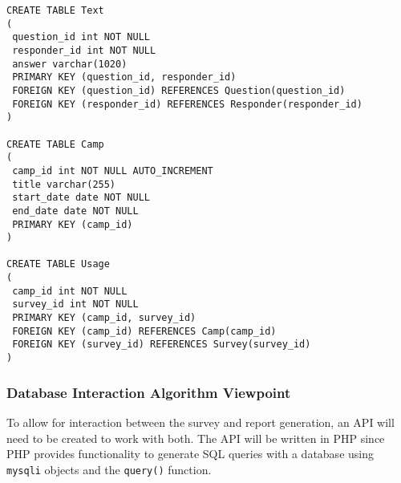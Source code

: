 \documentclass[letterpaper,10pt,serif, draftclsnofoot,onecolumn, compsoc, titlepage]{IEEEtran}
\begin{document}
\begin{lstlisting}
CREATE TABLE Text
(
 question_id int NOT NULL
 responder_id int NOT NULL
 answer varchar(1020)
 PRIMARY KEY (question_id, responder_id)
 FOREIGN KEY (question_id) REFERENCES Question(question_id)
 FOREIGN KEY (responder_id) REFERENCES Responder(responder_id)
)

CREATE TABLE Camp
(
 camp_id int NOT NULL AUTO_INCREMENT
 title varchar(255)
 start_date date NOT NULL
 end_date date NOT NULL
 PRIMARY KEY (camp_id)
)

CREATE TABLE Usage
(
 camp_id int NOT NULL
 survey_id int NOT NULL
 PRIMARY KEY (camp_id, survey_id)
 FOREIGN KEY (camp_id) REFERENCES Camp(camp_id)
 FOREIGN KEY (survey_id) REFERENCES Survey(survey_id)
)
\end{lstlisting}

\subsubsection{Database Interaction Algorithm Viewpoint}
To allow for interaction between the survey and report generation, an API will need to be created to work with both.
The API will be written in PHP since PHP provides functionality to generate SQL queries with a database using \texttt{mysqli} objects and the \texttt{query()} function.
\end{document}
